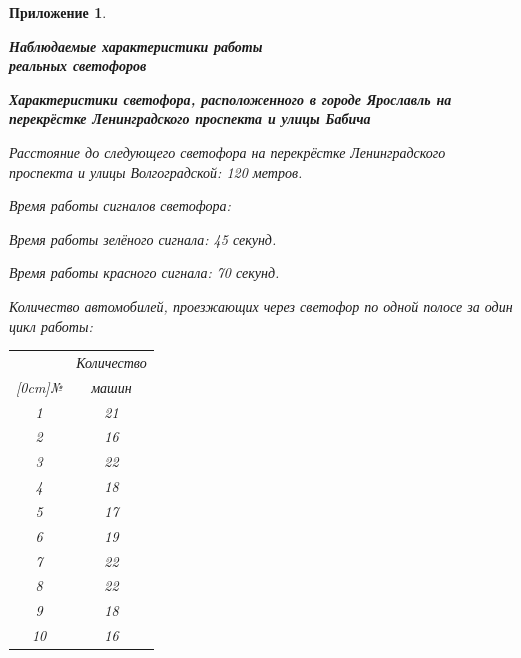\documentclass[12pt, a4paper]{extarticle}
\numberwithin{equation}{section}
\newtheorem{attachment}{\hspace{12cm}  Приложение}
\numberwithin{figure}{section}
\begin{document}
\begin{attachment} \label{att}
	\begin{center}
		\vspace{1cm}
		\rm{\Large{\textbf{ Наблюдаемые характеристики работы \\ реальных светофоров }}}
		\vspace{\baselineskip}
	\end{center}

\textup{\textbf{Характеристики светофора, расположенного в городе Ярославль на перекрёстке Ленинградского проспекта и улицы Бабича }}
\newline

\noindent\textup{Расстояние до следующего светофора на перекрёстке Ленинградского проспекта и улицы Волгоградской:} 120 метров.

\noindent\textup{Время работы сигналов светофора:}

Время работы зелёного сигнала: 45 секунд.
			
Время работы красного сигнала: 70 секунд.

\noindent\textup{Количество автомобилей, проезжающих через светофор по одной полосе за один цикл работы:}
	
\begin{table}[h!]
	\begin{minipage}{0.23\linewidth}
		
		\centering
		\begin{tabular}{|c|c|}
			\hline
			 & Количество \\ 
			 \raisebox{1.5ex}[0cm]{№}
			 & машин 
			\\\hline
			1 & 21
			\\\hline
			2 & 16
			\\\hline
			3 & 22
			\\\hline
			4 & 18
			\\\hline
			5 & 17
			\\\hline
			6 & 19
			\\\hline
			7 & 22
			\\\hline
			8 & 22
			\\\hline
			9 & 18
			\\\hline
			10 & 16
			\\\hline
		\end{tabular}
	\end{minipage}
	\begin{minipage}{0.23\linewidth}
		\centering
		

\end{minipage}
\end{table}
\end{attachment}
\end{document}
